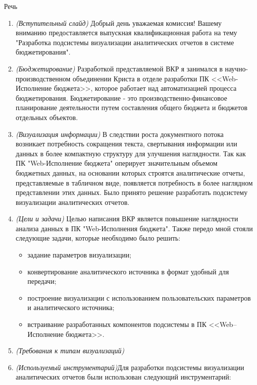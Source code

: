 \documentclass[a4paper, 12pt]{report}
\begin{document}
\begin{center}
	\Large Речь
\end{center}\par
\begin{enumerate}[label=\textbf{\arabic*})]
	\item \textit{(Вступительный слайд)} Добрый день уважаемая комиссия! Вашему вниманию предоставляется выпускная квалификационная работа на тему "Разработка подсистемы визуализации аналитических отчетов в системе бюджетирования".
	\item \textit{(Бюджетирование)} Разработкой представляемой ВКР я занимался в научно-производственном объединении Криста в отделе разработки ПК <<Web-Исполнение бюджета>>, которое работает над автоматизацией процесса бюджетирования. Бюджетирование - это производственно-финансовое планирование деятельности путем составления общего бюджета и бюджетов отдельных объектов.
	\item \textit{(Визуализация информации)} В следствии роста документного потока возникает потребность сокращения текста, свертывания информации или данных в более компактную структуру для улучшения наглядности. Так как ПК "Web-Исполнение бюджета" оперирует значительным объемом бюджетных данных, на основании которых строятся аналитические отчеты, представляемые в табличном виде, появляется потребность в более наглядном представлении этих данных. Было принято решение разработать подсистему визуализации аналитических отчетов.
	\item \textit{(Цели и задачи)} Целью написания ВКР является повышение наглядности анализа данных в ПК "Web-Исполнения бюджета". Также передо мной стояли следующие задачи, которые необходимо было решить:
		\begin{itemize}
			\item задание параметров визуализации;
			\item конвертирование аналитического источника в формат удобный для передачи;
			\item построение визуализации с использованием пользовательских параметров и аналитического источника;
			\item встраивание разработанных компонентов подсистемы в ПК <<Web–Ис\-пол\-не\-ние бюджета>>.
		\end{itemize}
	\item \textit{(Требования к типам визуализаций)} 
	\item \textit{(Используемый инструментарий)}Для разработки подсистемы визуализации аналитических отчетов были использован следующий инструментарий:

\end{enumerate}
\end{document}
